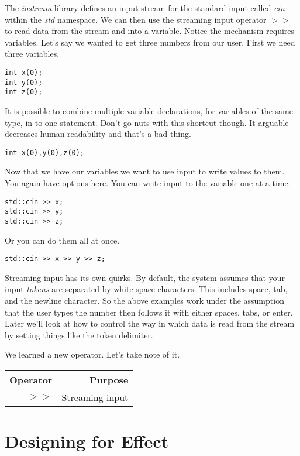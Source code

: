 \documentclass[]{tufte-handout}
\begin{document}
The \textit{iostream} library defines an input stream for the standard input called \textit{cin} within the \textit{std} namespace. We can then use the streaming input operator $>>$ to read data from the stream and into a variable. Notice the mechanism requires variables.  Let's say we wanted to get three numbers from our user. First we need three variables.
\begin{verbatim}
int x(0);
int y(0);
int z(0);
\end{verbatim}
It is possible to combine multiple variable declarations, for variables of the same type, in to one statement. Don't go nuts with this shortcut though.  It arguable decreases human readability and that's a bad thing. 
\begin{verbatim}
int x(0),y(0),z(0);
\end{verbatim}

Now that we have our variables we want to use input to write values to them. You again have options here. You can write input to the variable one at a time.
\begin{verbatim}
std::cin >> x;
std::cin >> y;
std::cin >> z;
\end{verbatim}
Or you can do them all at once.
\begin{verbatim}
std::cin >> x >> y >> z;
\end{verbatim}

Streaming input has its own quirks.  By default, the system assumes that your input \textit{tokens} are separated by white space characters. This includes space, tab, and the newline character. So the above examples work under the assumption that the user types the number then follows it with either spaces, tabs, or enter. Later we'll look at how to control the way in which data is read from the stream by setting things like the token delimiter.

We learned a new operator. Let's take note of it.
\begin{center}
\begin{tabular}{rr}
Operator & Purpose \\ \hline
$>>$ & Streaming input 
\end{tabular}
\end{center}

\section{Designing for Effect}
\end{document}
